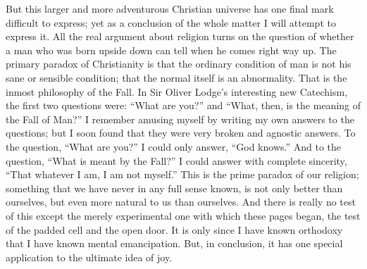 But this larger and more adventurous Christian universe has one final mark difficult to express; yet as a conclusion of the whole matter I will attempt to express it. All the real argument about religion turns on the question of whether a man who was born upside down can tell when he comes right way up. The primary paradox of Christianity is that the ordinary condition of man is not his sane or sensible condition; that the normal itself is an abnormality. That is the inmost philosophy of the Fall. In Sir Oliver Lodge’s interesting new Catechism, the first two questions were: “What are you?” and “What, then, is the meaning of the Fall of Man?” I remember amusing myself by writing my own answers to the questions; but I soon found that they were very broken and agnostic answers. To the question, “What are you?” I could only answer, “God knows.” And to the question, “What is meant by the Fall?” I could answer with complete sincerity, “That whatever I am, I am not myself.” This is the prime paradox of our religion; something that we have never in any full sense known, is not only better than ourselves, but even more natural to us than ourselves. And there is really no test of this except the merely experimental one with which these pages began, the test of the padded cell and the open door. It is only since I have known orthodoxy that I have known mental emancipation. But, in conclusion, it has one special application to the ultimate idea of joy.

